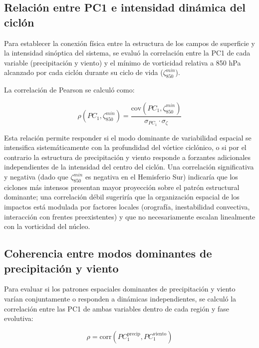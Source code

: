 \subsection{Relación entre PC1 e intensidad dinámica del ciclón}\label{subsubsec:pc1_vorticidad}

Para establecer la conexión física entre la estructura de los campos de superficie y la intensidad sinóptica del sistema, se evaluó la correlación entre la PC1 de cada variable (precipitación y viento) y el mínimo de vorticidad relativa a 850 hPa alcanzado por cada ciclón durante su ciclo de vida ($\zeta_{850}^{min}$).

La correlación de Pearson se calculó como:

\begin{equation}
    \rho(PC_1, \zeta_{850}^{min}) = \frac{\text{cov}(PC_1, \zeta_{850}^{min})}{\sigma_{PC_1} \cdot \sigma_{\zeta}}
\end{equation}

Esta relación permite responder si el modo dominante de variabilidad espacial se intensifica sistemáticamente con la profundidad del vórtice ciclónico, o si por el contrario la estructura de precipitación y viento responde a forzantes adicionales independientes de la intensidad del centro del ciclón. Una correlación significativa y negativa (dado que $\zeta_{850}^{min}$ es negativa en el Hemisferio Sur) indicaría que los ciclones más intensos presentan mayor proyección sobre el patrón estructural dominante; una correlación débil sugeriría que la organización espacial de los impactos está modulada por factores locales (orografía, inestabilidad convectiva, interacción con frentes preexistentes) y que no necesariamente escalan linealmente con la vorticidad del núcleo.

\subsection{Coherencia entre modos dominantes de precipitación y viento}\label{subsubsec:coherencia_pc1}

Para evaluar si los patrones espaciales dominantes de precipitación y viento varían conjuntamente o responden a dinámicas independientes, se calculó la correlación entre las PC1 de ambas variables dentro de cada región y fase evolutiva:

\begin{equation}
    \rho = \text{corr}(PC_1^{\text{precip}}, PC_1^{\text{viento}})
\end{equation}

